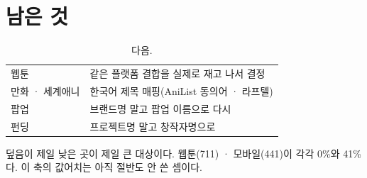 \documentclass[10pt]{article}
\begin{document}
\section{남은 것}

\begin{table}[t]
\centering\tsize
\caption{다음.}
\begin{tabular}{ll}
\toprule
웹툰 & 같은 플랫폼 결합을 실제로 재고 나서 결정 \\
만화 · 세계애니 & 한국어 제목 매핑(AniList 동의어 · 라프텔) \\
팝업 & 브랜드명 말고 팝업 이름으로 다시 \\
펀딩 & 프로젝트명 말고 창작자명으로 \\
\bottomrule
\end{tabular}
\end{table}

덮음이 제일 낮은 곳이 제일 큰 대상이다. 웹툰(711) · 모바일(441)이 각각
0\%와 41\%다. 이 축의 값어치는 아직 절반도 안 쓴 셈이다.
\end{document}
